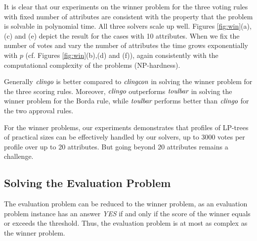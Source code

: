 It is clear that our experiments on the winner problem for the three voting rules with 
fixed number of attributes are consistent with the property that the problem
is solvable in polynomial time. All three solvers scale up well.
Figures \ref{fig:win}(a),(c) and (e) depict the result for the cases with 10 attributes.
When we fix the number of votes and vary the number of 
attributes the time grows exponentially with $p$ (cf. Figures \ref{fig:win}(b),(d) and (f)),
again consistently with the computational complexity of the problems (NP-hardness).

Generally $\textit{clingo}$ is better compared to $\textit{clingcon}$ in solving 
the winner problem for the three scoring rules. Moreover,
$\textit{clingo}$ outperforms $\textit{toulbar}$ in solving the winner problem for
the Borda rule, while $\textit{toulbar}$ performs better than $\textit{clingo}$
for the two approval rules.

For the winner problems, our experiments demonstrates that profiles
of LP-trees of practical sizes can be effectively handled by our
solvers, up to 3000 votes per profile over up to 20 attributes.
But going beyond 20 attributes remains a challenge.





\subsection{Solving the Evaluation Problem}
The evaluation problem can be reduced to the winner problem, as
an evaluation problem instance has an answer \textit{YES}
if and only if the score of the winner equals or exceeds the threshold.
Thus, the evaluation problem is at most as complex as
the winner problem.

